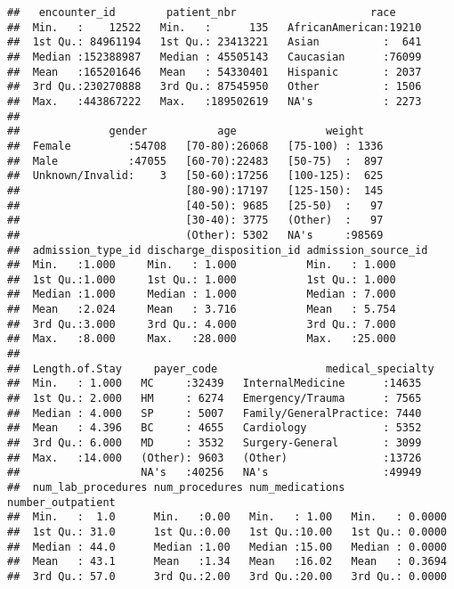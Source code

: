 \documentclass[
]{article}
\begin{document}
\begin{verbatim}
##   encounter_id        patient_nbr                     race      
##  Min.   :    12522   Min.   :      135   AfricanAmerican:19210  
##  1st Qu.: 84961194   1st Qu.: 23413221   Asian          :  641  
##  Median :152388987   Median : 45505143   Caucasian      :76099  
##  Mean   :165201646   Mean   : 54330401   Hispanic       : 2037  
##  3rd Qu.:230270888   3rd Qu.: 87545950   Other          : 1506  
##  Max.   :443867222   Max.   :189502619   NA's           : 2273  
##                                                                 
##              gender           age              weight     
##  Female         :54708   [70-80):26068   [75-100) : 1336  
##  Male           :47055   [60-70):22483   [50-75)  :  897  
##  Unknown/Invalid:    3   [50-60):17256   [100-125):  625  
##                          [80-90):17197   [125-150):  145  
##                          [40-50): 9685   [25-50)  :   97  
##                          [30-40): 3775   (Other)  :   97  
##                          (Other): 5302   NA's     :98569  
##  admission_type_id discharge_disposition_id admission_source_id
##  Min.   :1.000     Min.   : 1.000           Min.   : 1.000     
##  1st Qu.:1.000     1st Qu.: 1.000           1st Qu.: 1.000     
##  Median :1.000     Median : 1.000           Median : 7.000     
##  Mean   :2.024     Mean   : 3.716           Mean   : 5.754     
##  3rd Qu.:3.000     3rd Qu.: 4.000           3rd Qu.: 7.000     
##  Max.   :8.000     Max.   :28.000           Max.   :25.000     
##                                                                
##  Length.of.Stay     payer_code                 medical_specialty
##  Min.   : 1.000   MC     :32439   InternalMedicine      :14635  
##  1st Qu.: 2.000   HM     : 6274   Emergency/Trauma      : 7565  
##  Median : 4.000   SP     : 5007   Family/GeneralPractice: 7440  
##  Mean   : 4.396   BC     : 4655   Cardiology            : 5352  
##  3rd Qu.: 6.000   MD     : 3532   Surgery-General       : 3099  
##  Max.   :14.000   (Other): 9603   (Other)               :13726  
##                   NA's   :40256   NA's                  :49949  
##  num_lab_procedures num_procedures num_medications number_outpatient
##  Min.   :  1.0      Min.   :0.00   Min.   : 1.00   Min.   : 0.0000  
##  1st Qu.: 31.0      1st Qu.:0.00   1st Qu.:10.00   1st Qu.: 0.0000  
##  Median : 44.0      Median :1.00   Median :15.00   Median : 0.0000  
##  Mean   : 43.1      Mean   :1.34   Mean   :16.02   Mean   : 0.3694  
##  3rd Qu.: 57.0      3rd Qu.:2.00   3rd Qu.:20.00   3rd Qu.: 0.0000  

\end{verbatim}
\end{document}
